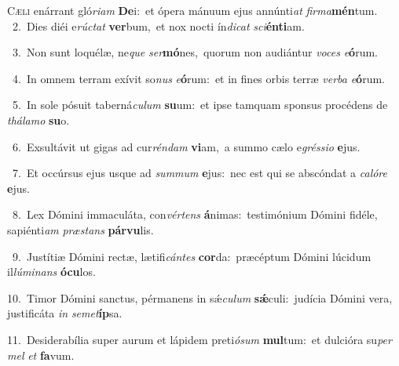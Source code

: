 \lettrine{\initial\textcolor{\initialcolor}{C}}{æli} enárrant gló\-\textit{ri}\-\textit{am} \textbf{De}\-i:~\star et ópera mánuum ejus annúnti\textit{at} \textit{fir}\-\textit{ma}\textbf{mén}tum.\\
{\numbfont\textcolor{\numbcolor}{~2.}}~Dies diéi e\-\textit{rúc}\-\textit{tat} \textbf{ver}\-bum,~\star et nox nocti ín\-\textit{di}\-\textit{cat} \textit{sci}\-\textbf{én}\textbf{ti}am.\par
{\numbfont\textcolor{\numbcolor}{~3.}}~Non sunt loquélæ, ne\textit{que} \textit{ser}\-\textbf{mó}nes,~\star quorum non audiántur \textit{vo}\-\textit{ces} \textit{e}\-\textbf{ó}rum.\par
{\numbfont\textcolor{\numbcolor}{~4.}}~In omnem terram exívit so\textit{nus} \textit{e}\-\textbf{ó}rum:~\star et in fines orbis terræ \textit{ver}\-\textit{ba} \textit{e}\-\textbf{ó}rum.\par
{\numbfont\textcolor{\numbcolor}{~5.}}~In sole pósuit taberná\-\textit{cu}\-\textit{lum} \textbf{su}\-um:~\star et ipse tamquam sponsus procédens de \textit{thá}\-\textit{la}\textit{mo} \textbf{su}\-o.\par
{\numbfont\textcolor{\numbcolor}{~6.}}~Exsultávit ut gigas ad cur\-\textit{rén}\-\textit{dam} \textbf{vi}\-am,~\star a summo cælo e\-\textit{grés}\-\textit{si}\textit{o} \textbf{e}\-jus.\par
{\numbfont\textcolor{\numbcolor}{~7.}}~Et occúrsus ejus usque ad \textit{sum}\-\textit{mum} \textbf{e}\-jus:~\star nec est qui se abscóndat a \textit{ca}\-\textit{ló}\textit{re} \textbf{e}\-jus.\par
{\numbfont\textcolor{\numbcolor}{~8.}}~Lex Dómini immaculáta, con\-\textit{vér}\-\textit{tens} \textbf{á}\-nimas:~\star testimónium Dómini fidéle, sapiénti\textit{am} \textit{præ}\-\textit{stans} \textbf{pár}\-\textbf{vu}lis.\par
{\numbfont\textcolor{\numbcolor}{~9.}}~Justítiæ Dómini rectæ, lætifi\-\textit{cán}\-\textit{tes} \textbf{cor}\-da:~\star præcéptum Dómini lúcidum il\-\textit{lú}\-\textit{mi}\textit{nans} \textbf{ó}\-\textbf{cu}los.\par
{\numbfont\textcolor{\numbcolor}{10.}}~Timor Dómini sanctus, pérmanens in sǽ\-\textit{cu}\-\textit{lum} \textbf{sǽ}\-culi:~\star judícia Dómini vera, justificáta \textit{in} \textit{se}\-\textit{met}\textbf{íp}sa.\par
{\numbfont\textcolor{\numbcolor}{11.}}~Desiderabília super aurum et lápidem preti\-\textit{ó}\-\textit{sum} \textbf{mul}\-tum:~\star et dulcióra su\textit{per} \textit{mel} \textit{et} \textbf{fa}\-vum.\par
